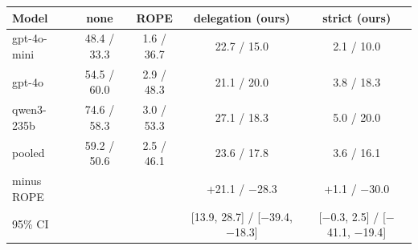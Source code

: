 \begin{tabular}{@{}lcccc@{}}
\toprule
Model & none & ROPE & \textbf{delegation (ours)} & \textbf{strict (ours)} \\
\midrule
gpt-4o-mini & 48.4 / 33.3 & 1.6 / 36.7 & 22.7 / 15.0 & 2.1 / 10.0 \\
gpt-4o & 54.5 / 60.0 & 2.9 / 48.3 & 21.1 / 20.0 & 3.8 / 18.3 \\
qwen3-235b & 74.6 / 58.3 & 3.0 / 53.3 & 27.1 / 18.3 & 5.0 / 20.0 \\
\midrule
pooled & 59.2 / 50.6 & 2.5 / 46.1 & 23.6 / 17.8 & 3.6 / 16.1 \\
minus ROPE & & & +21.1 / $-$28.3 & +1.1 / $-$30.0 \\
95\% CI & & & [13.9, 28.7] / [$-$39.4, $-$18.3] & [$-$0.3, 2.5] / [$-$41.1, $-$19.4] \\
\bottomrule
\end{tabular}
